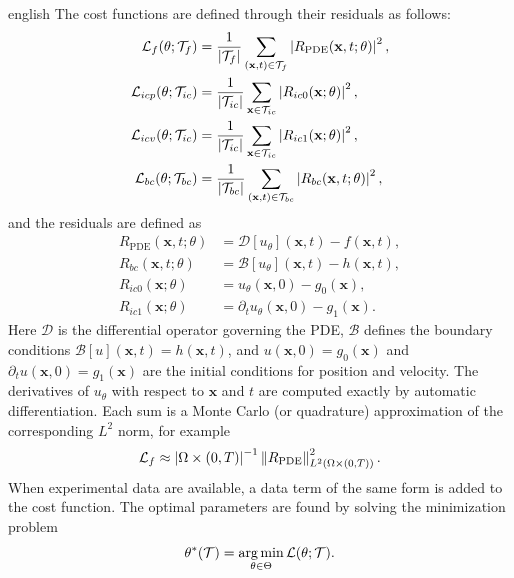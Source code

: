 \documentclass[0000.tex]{subfiles}
\begin{document}
\begin{hyphenrules}{english}
The cost functions are defined through their residuals as follows:
\begin{align}
  \mathcal{L}_f(\theta;\mathcal{T}_f)&=\frac{1}{\left\lvert \mathcal{T}_f \right\rvert}\sum_{(\mathbf{x},t)\in\mathcal{T}_f}\left\lvert R_{\mathrm{PDE}}(\mathbf{x},t;\theta) \right\rvert^2,\label{eq:loss-f}\\
  \mathcal{L}_{icp}(\theta;\mathcal{T}_{ic})&=\frac{1}{\left\lvert \mathcal{T}_{ic} \right\rvert}\sum_{\mathbf{x}\in\mathcal{T}_{ic}}\left\lvert R_{ic0}(\mathbf{x};\theta) \right\rvert^2,\label{eq:loss-icp}\\
  \mathcal{L}_{icv}(\theta;\mathcal{T}_{ic})&=\frac{1}{\left\lvert \mathcal{T}_{ic} \right\rvert}\sum_{\mathbf{x}\in\mathcal{T}_{ic}}\left\lvert R_{ic1}(\mathbf{x};\theta) \right\rvert^2,\label{eq:loss-icv}\\
  \mathcal{L}_{bc}(\theta;\mathcal{T}_{bc})&=\frac{1}{\left\lvert \mathcal{T}_{bc} \right\rvert}\sum_{(\mathbf{x},t)\in\mathcal{T}_{bc}}\left\lvert R_{bc}(\mathbf{x},t;\theta) \right\rvert^2,\label{eq:loss-bc}
\end{align}
and the residuals are defined as
\begin{align}
  R_{\mathrm{PDE}}(\mathbf{x},t;\theta)&=\mathcal{D}[u_\theta](\mathbf{x},t)-f(\mathbf{x},t), \label{eq:res-pde}\\
  R_{bc}(\mathbf{x},t;\theta)&=\mathcal{B}[u_\theta](\mathbf{x},t)-h(\mathbf{x},t), \label{eq:res-bc}\\
  R_{ic0}(\mathbf{x};\theta)&=u_\theta(\mathbf{x},0)-g_0(\mathbf{x}), \label{eq:res-ic0}\\
  R_{ic1}(\mathbf{x};\theta)&=\partial_t u_\theta(\mathbf{x},0)-g_1(\mathbf{x}). \label{eq:res-ic1}
\end{align}
Here $\mathcal{D}$ is the differential operator governing the PDE, $\mathcal{B}$ defines the boundary
conditions $\mathcal{B}[u](\mathbf{x},t)=h(\mathbf{x},t)$, and $u(\mathbf{x},0)=g_0(\mathbf{x})$ and $\partial_t u(\mathbf{x},0)=g_1(\mathbf{x})$ are the
initial conditions for position and velocity. The derivatives of $u_\theta$ with respect to $\mathbf{x}$ and $t$
are computed exactly by automatic differentiation. Each sum is a Monte Carlo (or quadrature)
approximation of the corresponding $L^2$ norm, for example
\[
  \mathcal{L}_f\approx\left\lvert \Omega\times(0,T) \right\rvert^{-1}\left\lVert R_{\mathrm{PDE}} \right\rVert_{L^2(\Omega\times(0,T))}^2.
\]
When
experimental data are available, a data term of the same form is added to the cost function. The optimal
parameters are found by solving the minimization problem
\begin{equation}
  \theta^{*}(\mathcal{T})=\operatorname*{arg\,min}_{\theta\in\Theta}\mathcal{L}(\theta;\mathcal{T}).
  \label{eq:pinn-argmin}
\end{equation}


\end{hyphenrules}
\end{document}
